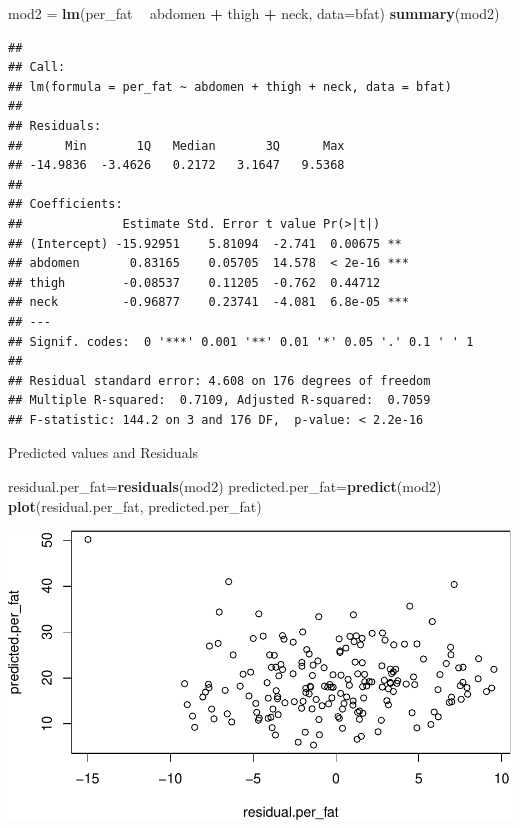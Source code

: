 \documentclass[]{article}
\newenvironment{Shaded}{\begin{snugshade}}{\end{snugshade}}
\newcommand{\KeywordTok}[1]{\textcolor[rgb]{0.13,0.29,0.53}{\textbf{#1}}}
\newcommand{\DataTypeTok}[1]{\textcolor[rgb]{0.13,0.29,0.53}{#1}}
\newcommand{\StringTok}[1]{\textcolor[rgb]{0.31,0.60,0.02}{#1}}
\newcommand{\OperatorTok}[1]{\textcolor[rgb]{0.81,0.36,0.00}{\textbf{#1}}}
\newcommand{\NormalTok}[1]{#1}
\begin{document}
\begin{Shaded}
\begin{Highlighting}[]
\NormalTok{mod2 =}\StringTok{ }\KeywordTok{lm}\NormalTok{(per_fat }\OperatorTok{~}\StringTok{ }\NormalTok{abdomen }\OperatorTok{+}\StringTok{ }\NormalTok{thigh }\OperatorTok{+}\StringTok{ }\NormalTok{neck, }\DataTypeTok{data=}\NormalTok{bfat)}
\KeywordTok{summary}\NormalTok{(mod2)}
\end{Highlighting}
\end{Shaded}

\begin{verbatim}
## 
## Call:
## lm(formula = per_fat ~ abdomen + thigh + neck, data = bfat)
## 
## Residuals:
##      Min       1Q   Median       3Q      Max 
## -14.9836  -3.4626   0.2172   3.1647   9.5368 
## 
## Coefficients:
##              Estimate Std. Error t value Pr(>|t|)    
## (Intercept) -15.92951    5.81094  -2.741  0.00675 ** 
## abdomen       0.83165    0.05705  14.578  < 2e-16 ***
## thigh        -0.08537    0.11205  -0.762  0.44712    
## neck         -0.96877    0.23741  -4.081  6.8e-05 ***
## ---
## Signif. codes:  0 '***' 0.001 '**' 0.01 '*' 0.05 '.' 0.1 ' ' 1
## 
## Residual standard error: 4.608 on 176 degrees of freedom
## Multiple R-squared:  0.7109, Adjusted R-squared:  0.7059 
## F-statistic: 144.2 on 3 and 176 DF,  p-value: < 2.2e-16
\end{verbatim}

Predicted values and Residuals

\begin{Shaded}
\begin{Highlighting}[]
\NormalTok{residual.per_fat=}\KeywordTok{residuals}\NormalTok{(mod2)}
\NormalTok{predicted.per_fat=}\KeywordTok{predict}\NormalTok{(mod2)}
\KeywordTok{plot}\NormalTok{(residual.per_fat, predicted.per_fat)}
\end{Highlighting}
\end{Shaded}

\includegraphics{BodyFat_files/figure-latex/unnamed-chunk-10-1.pdf}
\end{document}
